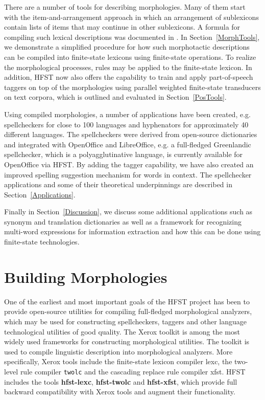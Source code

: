 \documentclass[draft]{llncs}
\begin{document}
There are a number of tools for describing morphologies. Many of them 
start with the item-and-arrangement approach in which an arrangement of 
sublexicons contain lists of items that may continue in other sublexicons. A formula
for compiling such lexical descriptions was documented in \cite{linden/2009/sfcm}.
In Section~\ref{MorphTools}, we demonstrate a simplified procedure 
for how such morphotactic descriptions 
can be compiled into finite-state lexicons using finite-state operations. 
To realize the morphological processes, rules may be applied to the finite-state lexicon. 
In addition, HFST now also offers the capability to train and apply part-of-speech
taggers on top of the morphologies using parallel weighted finite-state transducers on 
text corpora, which is outlined and evaluated in Section~\ref{PosTools}.

Using compiled morphologies, a number of applications
have been created, e.g. spellcheckers for close to 100 languages and
hyphenators for approximately 40 different languages. The spellcheckers were
derived from open-source dictionaries and integrated with OpenOffice and
LibreOffice, e.g. a full-fledged Greenlandic spellchecker, which is a
polyagglutinative language, is currently available for OpenOffice via HFST. 
By adding the tagger capability, we have also created an
improved spelling suggestion mechanism for words in context.
The spellchecker applications and some of their theoretical underpinnings are described 
in Section~\ref{Applications}.

Finally  in Section~\ref{Discussion}, we discuss some additional applications such as 
synonym and translation dictionaries as well as a framework for recognizing 
multi-word expressions for information extraction and how this can be done 
using finite-state technologies.

\section{Building Morphologies}\label{LexiconTools}



One of the earliest and most important goals of the HFST project has
been to provide open-source utilities for compiling full-fledged
morphological analyzers, which may be used for constructing spellcheckers,
taggers and other language technological utilities of good
quality. The Xerox toolkit \cite{beesley/2003} is among the most
widely used frameworks for constructing morphological utilities. The
toolkit is used to compile linguistic description into morphological
analyzers. More specifically, Xerox tools include the finite-state
lexicon compiler lexc, the two-level rule compiler \verb|twolc| and the
cascading replace rule compiler xfst. HFST includes the tools
\textbf{hfst-lexc}, \textbf{hfst-twolc} and \textbf{hfst-xfst}, which provide full backward
compatibility with Xerox tools and augment their functionality.
\end{document}
